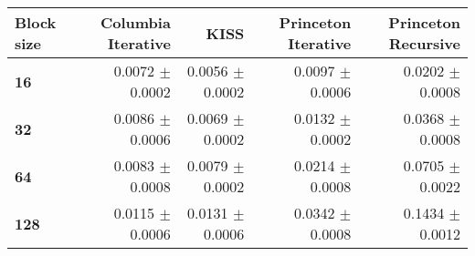 \begin{tabular}{lrrrr}\toprule
\textbf{Block size}  & \textbf{Columbia Iterative} & \textbf{KISS} & \textbf{Princeton Iterative} & \textbf{Princeton Recursive}\\\midrule
\textbf{16}  & 0.0072 $\pm$ 0.0002 & 0.0056 $\pm$ 0.0002 & 0.0097 $\pm$ 0.0006 & 0.0202 $\pm$ 0.0008\\
\textbf{32}  & 0.0086 $\pm$ 0.0006 & 0.0069 $\pm$ 0.0002 & 0.0132 $\pm$ 0.0002 & 0.0368 $\pm$ 0.0008\\
\textbf{64}  & 0.0083 $\pm$ 0.0008 & 0.0079 $\pm$ 0.0002 & 0.0214 $\pm$ 0.0008 & 0.0705 $\pm$ 0.0022\\
\textbf{128} & 0.0115 $\pm$ 0.0006 & 0.0131 $\pm$ 0.0006 & 0.0342 $\pm$ 0.0008 & 0.1434 $\pm$ 0.0012\\
\bottomrule
\end{tabular}
